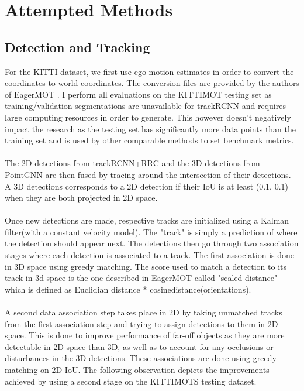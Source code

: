 \documentclass{article}
\begin{document}
\section{Attempted Methods}
\subsection{Detection and Tracking}
For the KITTI dataset, we first use ego motion estimates in order to convert the coordinates to world coordinates. The conversion files are provided by the authors of EagerMOT \cite{Kim21ICRA}. I perform all evaluations on the KITTIMOT\cite{Geiger2012CVPR} testing set as training/validation segmentations are unavailable for trackRCNN \cite{luiten2019track}
and requires large computing resources in order to generate. This however doesn't negatively impact the research as the testing set has significantly more data points than the training set and is used by other comparable methods to set benchmark metrics.\\\\
The 2D detections from trackRCNN\cite{luiten2019track}+RRC\cite{Voigtlaender19CVPR_MOTS} and the 3D detections from PointGNN \cite{Point-GNN} are then fused by tracing around the intersection of their detections. A 3D detections corresponds to a 2D detection if their IoU is at least (0.1, 0.1) when they are both projected in 2D space.\\\\
Once new detections are made, respective tracks are initialized using a Kalman filter(with a constant velocity model). The "track" is simply a prediction of where the detection should appear next. The detections then go through two association stages where each detection is associated to a track. The first association is done in 3D space using greedy matching. The score used to match a detection to its track in 3d space is the one described in EagerMOT\cite{Kim21ICRA} called "scaled distance" which is defined as Euclidian distance * cosinedistance(orientations). \\\\
A second data association step takes place in 2D by taking unmatched tracks from the first association step and trying to assign detections to them in 2D space. This is done to improve performance of far-off objects as they are more detectable in 2D space than 3D, as well as to account for any occlusions or disturbances in the 3D detections. These associations are done using greedy matching on 2D IoU. The following observation depicts the improvements achieved by using a second stage on the KITTIMOTS \cite{Geiger2012CVPR} testing dataset. 
\end{document}
